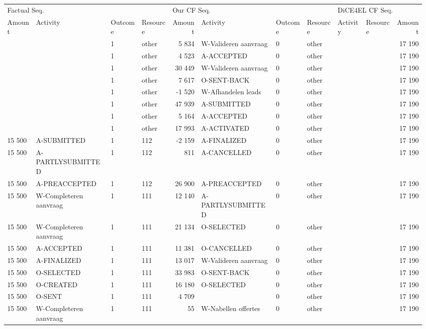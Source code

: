 \begin{tabular}{llllrlllllr}
\toprule
\multicolumn{4}{l}{Factual Seq.} & \multicolumn{4}{l}{Our CF Seq.} & \multicolumn{3}{l}{DiCE4EL CF Seq.} \\
Amount & Activity & Outcome & Resource & Amount & Activity & Outcome & Resource & Activity & Resource & Amount \\
\midrule
 &  & 1 & other & 5 834 & W-Valideren aanvraag & 0 & other &  &  & 17 190 \\
 &  & 1 & other & 4 523 & A-ACCEPTED & 0 & other &  &  & 17 190 \\
 &  & 1 & other & 30 449 & W-Valideren aanvraag & 0 & other &  &  & 17 190 \\
 &  & 1 & other & 7 617 & O-SENT-BACK & 0 & other &  &  & 17 190 \\
 &  & 1 & other & -1 520 & W-Afhandelen leads & 0 & other &  &  & 17 190 \\
 &  & 1 & other & 47 939 & A-SUBMITTED & 0 & other &  &  & 17 190 \\
 &  & 1 & other & 5 164 & A-ACCEPTED & 0 & other &  &  & 17 190 \\
 &  & 1 & other & 17 993 & A-ACTIVATED & 0 & other &  &  & 17 190 \\
15 500 & A-SUBMITTED & 1 & 112 & -2 159 & A-FINALIZED & 0 & other &  &  & 17 190 \\
15 500 & A-PARTLYSUBMITTED & 1 & 112 & 811 & A-CANCELLED & 0 & other &  &  & 17 190 \\
15 500 & A-PREACCEPTED & 1 & 112 & 26 900 & A-PREACCEPTED & 0 & other &  &  & 17 190 \\
15 500 & W-Completeren aanvraag & 1 & 111 & 12 140 & A-PARTLYSUBMITTED & 0 & other &  &  & 17 190 \\
15 500 & W-Completeren aanvraag & 1 & 111 & 21 134 & O-SELECTED & 0 & other &  &  & 17 190 \\
15 500 & A-ACCEPTED & 1 & 111 & 11 381 & O-CANCELLED & 0 & other &  &  & 17 190 \\
15 500 & A-FINALIZED & 1 & 111 & 13 017 & W-Valideren aanvraag & 0 & other &  &  & 17 190 \\
15 500 & O-SELECTED & 1 & 111 & 33 983 & O-SENT-BACK & 0 & other &  &  & 17 190 \\
15 500 & O-CREATED & 1 & 111 & 16 180 & O-SELECTED & 0 & other &  &  & 17 190 \\
15 500 & O-SENT & 1 & 111 & 4 709 &  & 0 & other &  &  & 17 190 \\
15 500 & W-Completeren aanvraag & 1 & 111 & 55 & W-Nabellen offertes & 0 & other &  &  & 17 190 \\

\end{tabular}
